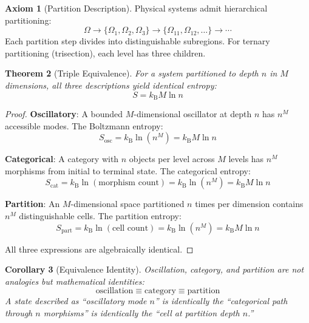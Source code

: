 \documentclass[twocolumn,10pt]{article}
\newtheorem{theorem}{Theorem}[section]
\newtheorem{corollary}[theorem]{Corollary}
\theoremstyle{definition}
\newtheorem{axiom}[theorem]{Axiom}
\theoremstyle{remark}
\newcommand{\kB}{k_{\mathrm{B}}}
\begin{document}
\begin{axiom}[Partition Description]
\label{ax:partition}
Physical systems admit hierarchical partitioning:
\begin{equation}
\Omega \to \{\Omega_1, \Omega_2, \Omega_3\} \to \{\Omega_{11}, \Omega_{12}, \ldots\} \to \cdots
\end{equation}
Each partition step divides into distinguishable subregions. For ternary partitioning (trisection), each level has three children.
\end{axiom}

\begin{theorem}[Triple Equivalence]
\label{thm:triple}
For a system partitioned to depth $n$ in $M$ dimensions, all three descriptions yield identical entropy:
\begin{equation}
\boxed{S = \kB M \ln n}
\end{equation}
\end{theorem}

\begin{proof}
\textbf{Oscillatory}: A bounded $M$-dimensional oscillator at depth $n$ has $n^M$ accessible modes. The Boltzmann entropy:
\begin{equation}
S_{\text{osc}} = \kB \ln(n^M) = \kB M \ln n
\end{equation}

\textbf{Categorical}: A category with $n$ objects per level across $M$ levels has $n^M$ morphisms from initial to terminal state. The categorical entropy:
\begin{equation}
S_{\text{cat}} = \kB \ln(\text{morphism count}) = \kB \ln(n^M) = \kB M \ln n
\end{equation}

\textbf{Partition}: An $M$-dimensional space partitioned $n$ times per dimension contains $n^M$ distinguishable cells. The partition entropy:
\begin{equation}
S_{\text{part}} = \kB \ln(\text{cell count}) = \kB \ln(n^M) = \kB M \ln n
\end{equation}

All three expressions are algebraically identical.
\end{proof}

\begin{corollary}[Equivalence Identity]
\label{cor:equivalence}
Oscillation, category, and partition are not analogies but mathematical identities:
\begin{equation}
\text{oscillation} \equiv \text{category} \equiv \text{partition}
\end{equation}
A state described as ``oscillatory mode $n$'' is identically the ``categorical path through $n$ morphisms'' is identically the ``cell at partition depth $n$.''
\end{corollary}
\end{document}
